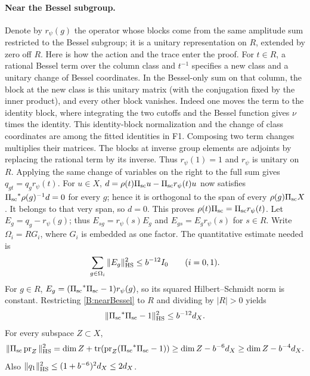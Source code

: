 \paragraph{Near the Bessel subgroup.}
Denote by \(r_\psi(g)\) the operator whose blocks come from the
same amplitude sum restricted to the Bessel subgroup; it is a
unitary representation on \(R\), extended by zero off \(R\).
Here is how the action and the trace enter the proof.
For \(t\in R\), a rational Bessel term over the column class and
\(t^{-1}\) specifies a new class and a unitary change of Bessel
coordinates. In the Bessel-only sum on that column, the block
at the new class is this unitary matrix (with the conjugation
fixed by the inner product), and every other block vanishes.
Indeed one moves the term to the identity block, where integrating
the two cutoffs and the Bessel function gives \(\nu\) times the
identity. This identity-block normalization and the change of class
coordinates are among the fitted identities in F1. Composing two
term changes multiplies their matrices. The blocks at inverse group
elements are adjoints by replacing the rational term by its inverse.
Thus \(r_\psi(1)=1\) and \(r_\psi\) is unitary on \(R\).
Applying the same change of variables on the right to the
full sum gives \(q_{gt}=q_g r_\psi(t)\). For \(u\in X\),
\(d=\rho(t){\Pi_{\rm sc}}u-{\Pi_{\rm sc}}r_\psi(t)u\) now satisfies
\({\Pi_{\rm sc}}^*\rho(g)^{-1}d=0\) for every \(g\); hence it is orthogonal to
the span of every \(\rho(g){\Pi_{\rm sc}}X\). It belongs to that very span, so
\(d=0\). This proves \(\rho(t){\Pi_{\rm sc}}={\Pi_{\rm sc}}r_\psi(t)\).
Let \(E_g=q_g-r_\psi(g)\); thus \(E_{sg}=r_\psi(s)E_g\) and
\(E_{gs}=E_gr_\psi(s)\) for \(s\in R\). Write
\(\Omega_i=R G_i\), where \(G_i\) is embedded as one factor.
The quantitative estimate needed is
\begin{equation}
\label{B:nearBessel}
 \sum_{g\in\Omega_i}\|E_g\|_{\rm HS}^2\le b^{-12}I_0
 \qquad(i=0,1).
\end{equation}
For \(g\in R\), \(E_g=({\Pi_{\rm sc}}^*{\Pi_{\rm sc}}-1)r_\psi(g)\), so its squared
Hilbert--Schmidt norm is constant. Restricting \eqref{B:nearBessel}
to \(R\) and dividing by \(|R|>0\) yields
\begin{equation}
\label{B:defect}
 \|{\Pi_{\rm sc}}^*{\Pi_{\rm sc}}-1\|_{\rm HS}^2\le b^{-12}d_X .
\end{equation}
For every subspace \(Z\subset X\),
\[
 \|{\Pi_{\rm sc}}\operatorname{pr}_Z\|_{\rm HS}^2
 =\dim Z+\operatorname{tr}(\operatorname{pr}_Z({\Pi_{\rm sc}}^*{\Pi_{\rm sc}}-1))
 \ge\dim Z-b^{-6}d_X\ge\dim Z-b^{-4}d_X.
\]
Also \(\|q_1\|_{\rm HS}^2\le(1+b^{-6})^2 d_X\le 2d_X\).

